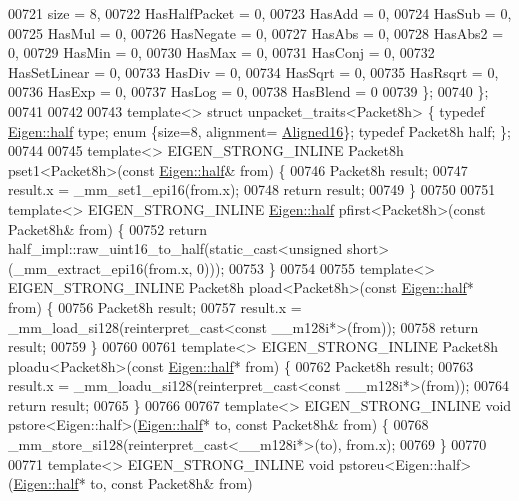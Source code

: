 \begin{DoxyCode}
00721     size = 8,
00722     HasHalfPacket = 0,
00723     HasAdd    = 0,
00724     HasSub    = 0,
00725     HasMul    = 0,
00726     HasNegate = 0,
00727     HasAbs    = 0,
00728     HasAbs2   = 0,
00729     HasMin    = 0,
00730     HasMax    = 0,
00731     HasConj   = 0,
00732     HasSetLinear = 0,
00733     HasDiv = 0,
00734     HasSqrt = 0,
00735     HasRsqrt = 0,
00736     HasExp = 0,
00737     HasLog = 0,
00738     HasBlend = 0
00739   \};
00740 \};
00741 
00742 
00743 \textcolor{keyword}{template}<> \textcolor{keyword}{struct }unpacket\_traits<Packet8h> \{ \textcolor{keyword}{typedef} \hyperlink{struct_eigen_1_1half}{Eigen::half} type; \textcolor{keyword}{enum} \{size=8, alignment=
      \hyperlink{group__enums_gga45fe06e29902b7a2773de05ba27b47a1af8e2bf74b04c02199f62c5e3c06dbfcc}{Aligned16}\}; \textcolor{keyword}{typedef} Packet8h half; \};
00744 
00745 \textcolor{keyword}{template}<> EIGEN\_STRONG\_INLINE Packet8h pset1<Packet8h>(\textcolor{keyword}{const} \hyperlink{struct_eigen_1_1half}{Eigen::half}& from) \{
00746   Packet8h result;
00747   result.x = \_mm\_set1\_epi16(from.x);
00748   \textcolor{keywordflow}{return} result;
00749 \}
00750 
00751 \textcolor{keyword}{template}<> EIGEN\_STRONG\_INLINE \hyperlink{struct_eigen_1_1half}{Eigen::half} pfirst<Packet8h>(\textcolor{keyword}{const} Packet8h& from) \{
00752   \textcolor{keywordflow}{return} half\_impl::raw\_uint16\_to\_half(static\_cast<unsigned short>(\_mm\_extract\_epi16(from.x, 0)));
00753 \}
00754 
00755 \textcolor{keyword}{template}<> EIGEN\_STRONG\_INLINE Packet8h pload<Packet8h>(\textcolor{keyword}{const} \hyperlink{struct_eigen_1_1half}{Eigen::half}* from) \{
00756   Packet8h result;
00757   result.x = \_mm\_load\_si128(reinterpret\_cast<const \_\_m128i*>(from));
00758   \textcolor{keywordflow}{return} result;
00759 \}
00760 
00761 \textcolor{keyword}{template}<> EIGEN\_STRONG\_INLINE Packet8h ploadu<Packet8h>(\textcolor{keyword}{const} \hyperlink{struct_eigen_1_1half}{Eigen::half}* from) \{
00762   Packet8h result;
00763   result.x = \_mm\_loadu\_si128(reinterpret\_cast<const \_\_m128i*>(from));
00764   \textcolor{keywordflow}{return} result;
00765 \}
00766 
00767 \textcolor{keyword}{template}<> EIGEN\_STRONG\_INLINE \textcolor{keywordtype}{void} pstore<Eigen::half>(\hyperlink{struct_eigen_1_1half}{Eigen::half}* to, \textcolor{keyword}{const} Packet8h& from) \{
00768   \_mm\_store\_si128(reinterpret\_cast<\_\_m128i*>(to), from.x);
00769 \}
00770 
00771 \textcolor{keyword}{template}<> EIGEN\_STRONG\_INLINE \textcolor{keywordtype}{void} pstoreu<Eigen::half>(\hyperlink{struct_eigen_1_1half}{Eigen::half}* to, \textcolor{keyword}{const} Packet8h& from) 

\end{DoxyCode}
